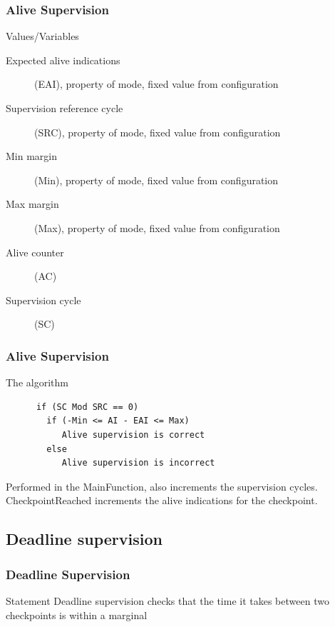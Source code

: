 \documentclass{beamer}
\begin{document}
\begin{frame}
  \frametitle{Alive Supervision}
  \begin{block}{Values/Variables}
    \begin{description}
      \item[Expected alive indications] (EAI), property of mode, fixed
        value from configuration
      \item[Supervision reference cycle] (SRC), property of mode, fixed value
        from configuration
      \item[Min margin] (Min), property of mode, fixed value from configuration
      \item[Max margin] (Max), property of mode, fixed value from configuration
      \item[Alive counter] (AC)
      \item[Supervision cycle] (SC)
    \end{description}
  \end{block}
\end{frame}

\begin{frame}[fragile]
  \frametitle{Alive Supervision}
  \begin{block}{The algorithm}
    \begin{lstlisting}
      if (SC Mod SRC == 0)
        if (-Min <= AI - EAI <= Max)
           Alive supervision is correct
        else
           Alive supervision is incorrect
    \end{lstlisting}
  \end{block}
  Performed in the MainFunction, also increments the supervision
  cycles.\\
  CheckpointReached increments the alive indications for the
  checkpoint.
\end{frame}

\subsection{Deadline supervision}
\begin{frame}
  \frametitle{Deadline Supervision}
  \begin{block}{Statement}
    Deadline supervision checks that the time it takes between two
    checkpoints is within a marginal
  \end{block}
\end{frame}
\end{document}
